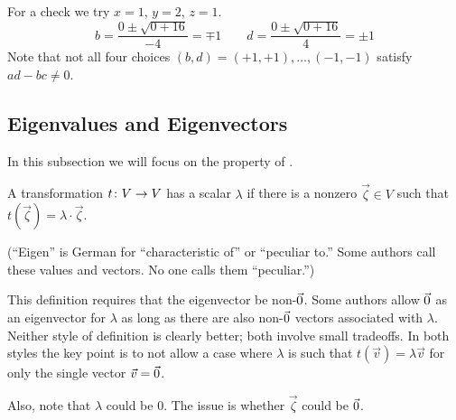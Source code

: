 \begin{exercises}
\begin{answer}
\begin{exparts}
        For a check we try \( x=1 \), \( y=2 \), \( z=1 \).
        \begin{equation*}
           b=\frac{0\pm\sqrt{0+16} }{-4}=\mp 1
           \qquad
           d=\frac{0\pm\sqrt{0+16} }{4}=\pm 1
        \end{equation*}
        Note that not all four choices \( (b,d)=(+1,+1),\dots,(-1,-1) \)
        satisfy \( ad-bc\neq 0 \).
      \end{exparts} 
    \end{answer}
\end{exercises}































\subsection{Eigenvalues and Eigenvectors}
In this subsection we will focus on the
property of .

\begin{definition} \label{def:Eigen}
A transformation \( \mbox{$t\colon V\to V$} \) has a scalar
%
\( \lambda \)
if there is a nonzero  \( \vec{\zeta}\in V \)
such that
$
  t(\vec{\zeta})=\lambda\cdot\vec{\zeta}
$.
\end{definition}

\noindent (``Eigen'' is German for ``characteristic of'' or ``peculiar to.'' 
Some authors call these %
 values and vectors.
No one calls them ``peculiar.'')

\begin{remark}
This definition requires that the eigenvector be non-$\vec{0}$.
Some authors allow $\vec{0}$ as
an eigenvector for $\lambda$ as long as there are also
non-$\vec{0}$ vectors associated with $\lambda$.
Neither style  of definition is clearly better; both involve small tradeoffs.
In both styles the key point is 
to not allow a case where $\lambda$ is such that
$t(\vec{v})=\lambda\vec{v}$ for only the single vector $\vec{v}=\vec{0}$.

Also, note that $\lambda$ could be $0$.
The issue is whether $\vec{\zeta}$ could be $\vec{0}$.  
\end{remark}

